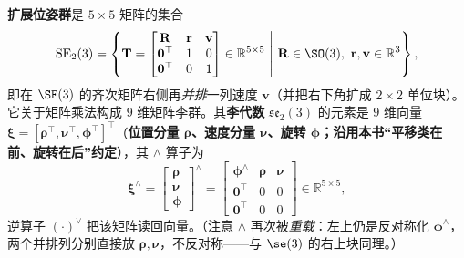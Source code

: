 \begin{definition}\label{def:se23}
\textbf{扩展位姿群}是 $5\times5$ 矩阵的集合
\begin{equation}
  \mathrm{SE}_2(3)=\left\{\mathbf{T}=\begin{bmatrix}\mathbf{R}&\mathbf{r}&\mathbf{v}\\\mathbf{0}^\top&1&0\\\mathbf{0}^\top&0&1\end{bmatrix}\in\mathbb{R}^{5\times5}\ \middle|\ \mathbf{R}\in\SO(3),\ \mathbf{r},\mathbf{v}\in\mathbb{R}^3\right\},
  \label{eq:se23-group}
\end{equation}
即在 $\SE(3)$ 的齐次矩阵右侧再\emph{并排}一列速度 $\mathbf{v}$（并把右下角扩成 $2\times2$ 单位块）。它关于矩阵乘法构成 $9$ 维矩阵李群。其\textbf{李代数} $\mathfrak{se}_2(3)$ 的元素是 $9$ 维向量 $\boldsymbol{\xi}=[\boldsymbol{\rho}^\top,\boldsymbol{\nu}^\top,\boldsymbol{\phi}^\top]^\top$（\textbf{位置分量 $\boldsymbol{\rho}$、速度分量 $\boldsymbol{\nu}$、旋转 $\boldsymbol{\phi}$；沿用本书“平移类在前、旋转在后”约定}），其 $\wedge$ 算子为
\begin{equation}
  \boldsymbol{\xi}^\wedge=\begin{bmatrix}\boldsymbol{\rho}\\\boldsymbol{\nu}\\\boldsymbol{\phi}\end{bmatrix}^{\!\wedge}
  =\begin{bmatrix}\boldsymbol{\phi}^\wedge&\boldsymbol{\rho}&\boldsymbol{\nu}\\\mathbf{0}^\top&0&0\\\mathbf{0}^\top&0&0\end{bmatrix}\in\mathbb{R}^{5\times5},
  \label{eq:se23-hat}
\end{equation}
逆算子 $(\cdot)^\vee$ 把该矩阵读回向量。（注意 $\wedge$ 再次被\emph{重载}：左上仍是反对称化 $\boldsymbol{\phi}^\wedge$，两个并排列分别直接放 $\boldsymbol{\rho},\boldsymbol{\nu}$，不反对称——与 $\se(3)$ 的右上块同理。）
\end{definition}

